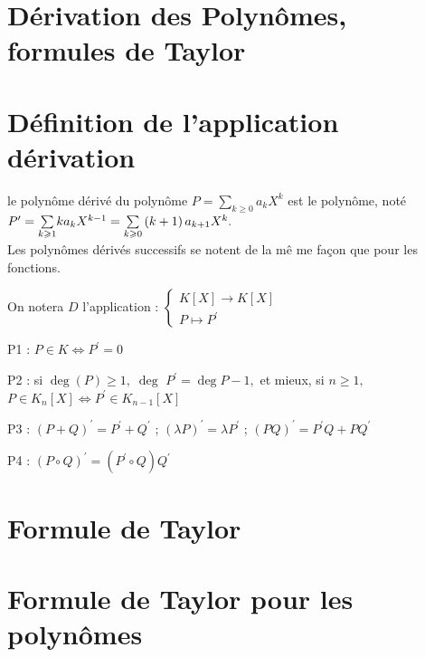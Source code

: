 \documentclass[french]{book}
\begin{document}
\section{Dérivation des Polynômes, formules de Taylor}

\section{D\'{e}finition de l'application dérivation}

\begin{defn}
le polyn\^{o}me d\'{e}riv\'{e} du polyn\^{o}me $P=\underset{k\geqslant
0}{\sum }a_{k}X^{k}$ est le polyn\^{o}me, not\'{e} $P^{\prime }=\underset{%
k\geqslant 1}{\sum }ka_{k}X^{k-1}=\underset{k\geqslant 0}{\sum }\left(
k+1\right) a_{k+1}X^{k}.$\\

Les polyn\^{o}mes d\'{e}riv\'{e}s successifs se notent de la m\^{e}%
me fa\c{c}on que pour les fonctions.

On notera $D$ l'application : $\left\{ 
\begin{array}{c}
K[X]\rightarrow K[X] \\ 
P\mapsto P^{\prime }%
\end{array}%
\right. $
\end{defn}

\begin{prop}

P1 : $P\in K\Leftrightarrow P^{\prime }=0$

\bigskip

P2 : si $\deg \left( P\right) \geqslant 1,\;\deg $ $P^{\prime }=\deg P-1,$
et mieux, si $n\geqslant 1,$ $P\in K_{n}[X]\Leftrightarrow P^{\prime }\in
K_{n-1}[X]$

\bigskip

P3 : $\left( P+Q\right) ^{\prime }=P^{\prime }+Q^{\prime }$ ; $\left(
\lambda P\right) ^{\prime }=\lambda P^{\prime }$ ; $\left( PQ\right)
^{\prime }=P^{\prime }Q+PQ^{\prime }$

\bigskip

P4 : $\left( P\circ Q\right) ^{\prime }=\left( P^{\prime }\circ Q\right)
Q^{\prime }$

\end{prop}

\section{Formule de Taylor}

\section{Formule de Taylor pour les polyn\^{o}mes}
\end{document}
